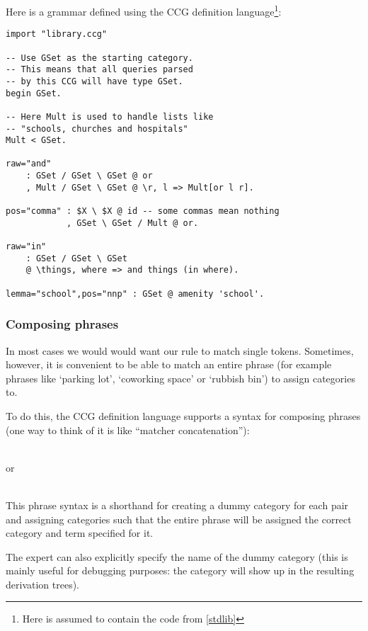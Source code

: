 \documentclass[main.tex]{subfiles}
\begin{document}
\begin{example}
Here is a grammar defined using the CCG definition language\footnote{
    Here  is assumed to contain the code from \cref{stdlib}
}:
\begin{lstlisting}
import "library.ccg"

-- Use GSet as the starting category.
-- This means that all queries parsed
-- by this CCG will have type GSet.
begin GSet.

-- Here Mult is used to handle lists like
-- "schools, churches and hospitals"
Mult < GSet.

raw="and"
    : GSet / GSet \ GSet @ or
    , Mult / GSet \ GSet @ \r, l => Mult[or l r].

pos="comma" : $X \ $X @ id -- some commas mean nothing
            , GSet \ GSet / Mult @ or.

raw="in"
    : GSet / GSet \ GSet
    @ \things, where => and things (in where).

lemma="school",pos="nnp" : GSet @ amenity 'school'.
\end{lstlisting}
\end{example}

\subsubsection{Composing phrases}
In most cases we would would want our rule to match single tokens. Sometimes,
however, it is convenient to be able to match an entire phrase (for example
phrases like `parking lot', `coworking space' or `rubbish bin') to assign
categories to.

To do this, the CCG definition language supports a syntax for composing phrases
(one way to think of it is like ``matcher concatenation''):
\begin{center}
     \code{<>}  \\
    or \\
       \\
\end{center}
This phrase syntax is a shorthand for creating a dummy category
for each pair and assigning categories such that the entire phrase will
be assigned the correct category and term specified for it.

The expert can also explicitly specify the name of the dummy category
(this is mainly useful for debugging purposes: the category will show up
in the resulting derivation trees).
\end{document}
